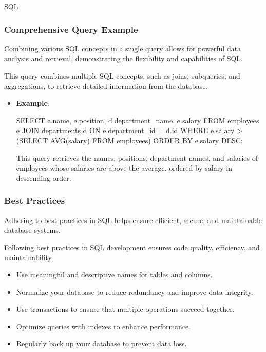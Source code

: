 \begin{notes}{SQL}
\begin{highlight}[Indexing]
    \end{highlight}
    
    \subsubsection*{Comprehensive Query Example}
    
    Combining various SQL concepts in a single query allows for powerful data analysis and retrieval, demonstrating the flexibility and capabilities of SQL.
    
    \begin{highlight}
    
        This query combines multiple SQL concepts, such as joins, subqueries, and aggregations, to retrieve detailed information from the database.
        
        \begin{itemize}
            \item \textbf{Example}:
    \begin{code}[SQL]
    SELECT e.name, e.position, d.department_name, e.salary
    FROM employees e
    JOIN departments d ON e.department_id = d.id
    WHERE e.salary > (SELECT AVG(salary) FROM employees)
    ORDER BY e.salary DESC;
    \end{code}
            This query retrieves the names, positions, department names, and salaries of employees whose salaries are above the average, ordered by salary in descending order.
        \end{itemize}
    
    \end{highlight}
    
    \subsubsection*{Best Practices}
    
    Adhering to best practices in SQL helps ensure efficient, secure, and maintainable database systems.
    
    \begin{highlight}
    
        Following best practices in SQL development ensures code quality, efficiency, and maintainability.
        
        \begin{itemize}
            \item Use meaningful and descriptive names for tables and columns.
            \item Normalize your database to reduce redundancy and improve data integrity.
            \item Use transactions to ensure that multiple operations succeed together.
            \item Optimize queries with indexes to enhance performance.
            \item Regularly back up your database to prevent data loss.
        \end{itemize}
    

\end{highlight}
\end{notes}
